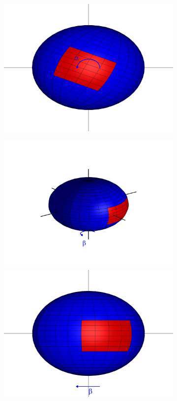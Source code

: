 \documentclass{pnastwo}
\begin{document}
\begin{figure}
\begin{subfigure}{0.2\textwidth}
\includegraphics[width=\textwidth]{sphere2_2}
\caption{}
\end{subfigure}
\begin{subfigure}{0.2\textwidth}
\includegraphics[width=\textwidth]{sphere_3}
\includegraphics[width=\textwidth]{sphere2_3}

\end{subfigure}
\end{figure}
\end{document}
